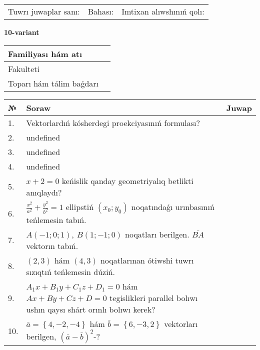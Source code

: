 \documentclass{article}
\begin{document}
\vspace{0.7cm}

\begin{tabular}{lll}
Tuwrı juwaplar sanı: \underline{\hspace{1cm}} & 
Bahası: \underline{\hspace{1cm}} & 
Imtixan alıwshınıń qolı: \underline{\hspace{2cm}} \\
\end{tabular}

\egroup

\newpage


\textbf{10-variant}\\

\bgroup
\def\arraystretch{1.6} %

\begin{tabular}{|m{5.7cm}|m{9.5cm}|}
\hline
Familiyası hám atı & \\
\hline
Fakulteti  & \\
\hline
Toparı hám tálim baǵdarı  & \\
\hline
\end{tabular}

\vspace{0.7cm}

\begin{tabular}{|m{0.7cm}|m{10cm}|m{4cm}|}
\hline
№ & Soraw & Juwap \\
\hline
1. & Vektorlardıń kósherdegi proekciyasınıń formulası? &  \\
\hline
2. & undefined &  \\
\hline
3. & undefined &  \\
\hline
4. & undefined &  \\
\hline
5. & \(x + 2 = 0\) keńislik qanday geometriyalıq betlikti anıqlaydı? &  \\
\hline
6. & \(\frac{x^{2}}{a^{2}} + \frac{y^{2}}{b^{2}} = 1\) ellipstiń \((x_{0};y_{0})\) noqatındaǵı urınbasınıń teńlemesin tabıń. &  \\
\hline
7. & \(A (- 1;0;1),\ B (1; - 1;0)\) noqatları berilgen. \(\bar{BA}\) vektorın tabıń. &  \\
\hline
8. & $(2, 3)$ hám $(4, 3)$ noqatlarınan ótiwshi tuwrı sızıqtıń teńlemesin dúziń. &  \\
\hline
9. & \(A_{1}x + B_{1}y + C_{1}z + D_{1} = 0\) hám \(Ax + By + Cz + D = 0\) tegislikleri parallel bolıwı ushın qaysı shárt orınlı bolıwı kerek? &  \\
\hline
10. & \(\bar{a} = \left\{ 4,- 2,- 4 \right\}\) hám \(\bar{b} = \left\{ 6,- 3, 2 \right\}\) vektorları berilgen, \((\bar{a} - \bar{b}) ^{2}\)-? & \\
\hline
\end{tabular}
\end{document}
